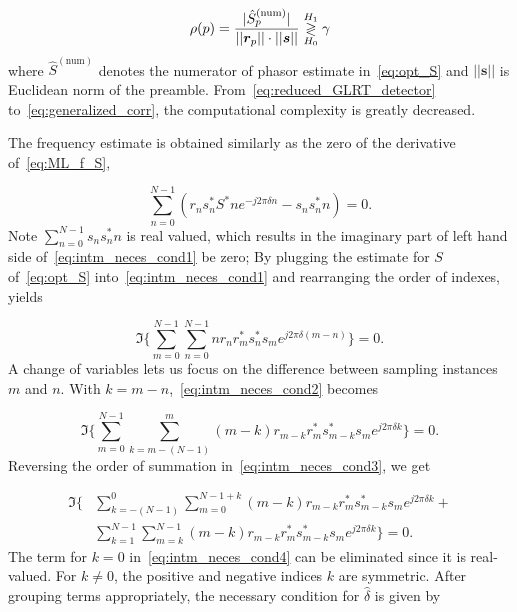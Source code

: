 \begin{equation}
  \label{eq:reduced_GLRT_detector}
  \rho(p)=
  \frac{|\hat{S}^{(\text{num})}_p|}
  {||\bm{r}_{p}||\cdot||\bm{s}||} \mathrel{\mathop\gtrless\limits^{H_1}_{H_0}} \gamma
\end{equation}
where $\hat{S}^{(\text{num})}$ denotes the numerator of phasor estimate in~\eqref{eq:opt_S} and $||\bm{s}||$ is Euclidean norm of the preamble. From~\eqref{eq:reduced_GLRT_detector} to~\eqref{eq:generalized_corr}, the computational complexity is greatly decreased.

The frequency estimate is obtained similarly as the zero of the
derivative of~\eqref{eq:ML_f_S},

\begin{equation}
    \label{eq:intm_neces_cond1}
    \sum_{n=0}^{N-1}{(r_{n}s_n^{*}S^{*}ne^{-j2\pi \delta n}-s_ns_n^{*}n)=0}.
    \end{equation}
Note $\sum_{n=0}^{N-1}{s_ns_n^{*}n}$ is real
valued, which results in the imaginary part of left hand side of~\eqref{eq:intm_neces_cond1} be zero;
By plugging the estimate for $S$ of~\eqref{eq:opt_S} into~\eqref{eq:intm_neces_cond1} and rearranging the order of indexes, yields

\begin{equation}
    \label{eq:intm_neces_cond2}
    \Im\bigg\{\sum_{m=0}^{N-1}{\sum_{n=0}^{N-1}{nr_{n}r_{m}^{*}s_n^{*}s_me^{j2\pi \delta(m-n)}}}\bigg\} = 0.
  \end{equation}
A change of variables lets us focus on the difference between sampling instances $m$ and $n$.
With $k=m-n$,~\eqref{eq:intm_neces_cond2} becomes

\begin{equation}
    \label{eq:intm_neces_cond3}
    \Im\bigg\{\sum_{m=0}^{N-1}{\sum_{k{=}m-(N-1)}^{m}{(m{-}k)r_{m-k}r_{m}^{*}s_{m-k}^{*}s_me^{j2\pi \delta k}}}\bigg\}=0.
  \end{equation}
Reversing the order of summation in~\eqref{eq:intm_neces_cond3}, we get

\begin{equation}
    \begin{aligned}
    \label{eq:intm_neces_cond4}
    \Im\bigg\{&\sum_{k=-(N-1)}^{0}\sum_{m=0}^{N-1+k}{(m{-}k)r_{m-k}r_{m}^{*}s_{m-k}^{*}s_me^{j2\pi \delta k}+}\\
    &\sum_{k=1}^{N-1}\sum_{m=k}^{N-1}{(m{-}k)r_{m-k}r_{m}^{*}s_{m-k}^{*}s_me^{j2\pi \delta k}}\bigg\}= 0.
    \end{aligned}
  \end{equation}
The term for $k{=}0$ in~\eqref{eq:intm_neces_cond4} can be eliminated since it is real-valued. For $k \neq 0$, the positive and negative indices $k$ are symmetric. 
After grouping terms appropriately, the necessary condition for $\hat{\delta}$ is given by

